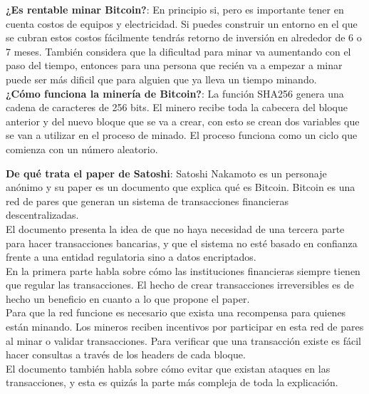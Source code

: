 \documentclass[a4paper,12pt]{lib/pub}
\begin{document}
\textbf{¿Es rentable minar Bitcoin?}:
En principio si, pero es importante tener en cuenta costos de equipos y electricidad. Si puedes construir un entorno en el que se cubran estos costos fácilmente tendrás retorno de inversión en alrededor de 6 o 7 meses. También considera que la dificultad para minar va aumentando con el paso del tiempo, entonces para una persona que recién va a empezar a minar puede ser más dificil que para alguien que ya lleva un tiempo minando.\\

\textbf{¿Cómo funciona la minería de Bitcoin?}:
La función SHA256 genera una cadena de caracteres de 256 bits. El minero recibe toda la cabecera del bloque anterior y del nuevo bloque que se va a crear, con esto se crean dos variables que se van a utilizar en el proceso de minado.
El proceso funciona como un ciclo que comienza con un número aleatorio.

\textbf{De qué trata el paper de Satoshi}:
Satoshi Nakamoto es un personaje anónimo y su paper es un documento que explica qué es Bitcoin. Bitcoin es una red de pares que generan un sistema de transacciones financieras descentralizadas.\\
El documento presenta la idea de que no haya necesidad de una tercera parte para hacer transacciones bancarias, y que el sistema no esté basado en confianza frente a una entidad regulatoria sino a datos encriptados.\\
En la primera parte habla sobre cómo las instituciones financieras siempre tienen que regular las transacciones. El hecho de crear transacciones irreversibles es de hecho un beneficio en cuanto a lo que propone el paper.\\
Para que la red funcione es necesario que exista una recompensa para quienes están minando. Los mineros reciben incentivos por participar en esta red de pares al minar o validar transacciones. Para verificar que una transacción existe es fácil hacer consultas a través de los headers de cada bloque.\\
El documento también habla sobre cómo evitar que existan ataques en las transacciones, y esta es quizás la parte más compleja de toda la explicación.\\
\end{document}

